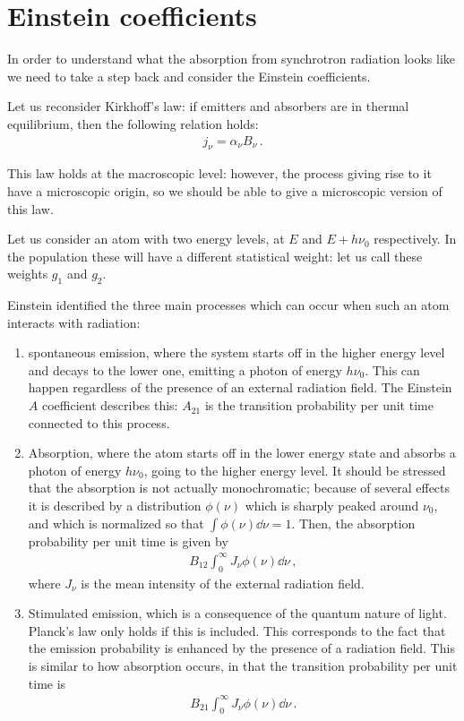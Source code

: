 \documentclass[main.tex]{subfiles}
\begin{document}
\section{Einstein coefficients}

In order to understand what the absorption from synchrotron radiation looks like we need to take a step back and consider the Einstein coefficients. 

Let us reconsider Kirkhoff's law: if emitters and absorbers are in thermal equilibrium, then the following relation holds: 
%
\begin{align}
j_\nu = \alpha _\nu B_\nu 
\,.
\end{align}

This law holds at the macroscopic level: however, the process giving rise to it have a microscopic origin, so we should be able to give a microscopic version of this law. 

Let us consider an atom with two energy levels, at \(E\) and \(E + h \nu_0\) respectively. 
In the population these will have a different statistical weight: let us call these weights \(g_1 \) and \(g_2 \). 

Einstein identified the three main processes which can occur when such an atom interacts with radiation: 
\begin{enumerate}
    \item spontaneous emission, where the system starts off in the higher energy level and decays to the lower one, emitting a photon of energy \(h \nu_0 \). This can happen regardless of the presence of an external radiation field. 
    The Einstein \(A\) coefficient describes this: \(A_{21} \) is the transition probability per unit time connected to this process. 
    \item Absorption, where the atom starts off in the lower energy state and absorbs a photon of energy \(h \nu_0 \), going to the higher energy level.
    It should be stressed that the absorption is not actually monochromatic; because of several effects it is described by a distribution \(\phi (\nu )\) which is sharply peaked around \(\nu_0\), and which is normalized so that \(\int \phi (\nu ) \dd{\nu } = 1\). 
    Then, the absorption probability per unit time is given by 
    \begin{align}
    B_{12} \int_0^{\infty } J_\nu \phi (\nu ) \dd{\nu }
    \,,
    \end{align}
    where \(J_\nu \) is the mean intensity of the external radiation field. 
    \item Stimulated emission, which is a consequence of the quantum nature of light. Planck's law only holds if this is included. This corresponds to the fact that the emission probability is enhanced by the presence of a radiation field. This is similar to how absorption occurs, in that the transition probability per unit time is 
    \begin{align}
    B_{21} \int_0^{\infty } J_\nu \phi (\nu ) \dd{\nu }
    \,.
    \end{align}    
\end{enumerate}
\end{document}
